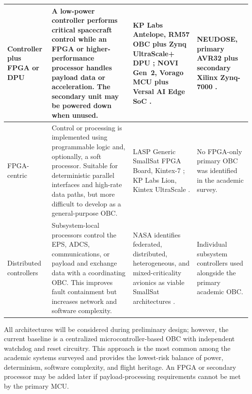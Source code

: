 \documentclass[10pt]{../datasheet}
\let\cite\citep
\begin{document}
\begin{longtable}{|p{2.8cm}|p{4.6cm}|p{5.3cm}|p{3.8cm}|}
  Controller plus FPGA or DPU                               &
  A low-power controller performs critical spacecraft control while an FPGA or
  higher-performance processor handles payload data or acceleration. The
  secondary unit may be powered down when unused.           &
  KP Labs Antelope, RM57 OBC plus Zynq UltraScale+ DPU
  \cite[p.~230]{nasa_soa_2023};
  NOVI Gen~2, Vorago MCU plus Versal AI Edge SoC
  \cite[p.~232]{nasa_soa_2026}.                             &
  NEUDOSE, primary AVR32 plus secondary Xilinx Zynq-7000
  \cite{neudose_obc_pub}.                                                              \\ \hline

  FPGA-centric                                              &
  Control or processing is implemented using programmable logic and,
  optionally, a soft processor. Suitable for deterministic parallel interfaces
  and high-rate data paths, but more difficult to develop as a general-purpose
  OBC.                                                      &
  LASP Generic SmallSat FPGA Board, Kintex-7
  \cite[p.~230]{nasa_soa_2023};
  KP Labs Lion, Kintex UltraScale
  \cite[p.~230]{nasa_soa_2023}.                             &
  No FPGA-only primary OBC was identified in the academic survey.                      \\ \hline

  Distributed controllers                                   &
  Subsystem-local processors control the EPS, ADCS, communications, or payload
  and exchange data with a coordinating OBC. This improves fault containment but
  increases network and software complexity.                &
  NASA identifies federated, distributed, heterogeneous, and mixed-criticality
  avionics as viable SmallSat architectures
  \cite[p.~225]{nasa_soa_2023}
  \cite[p.~221--222]{nasa_soa_2026}.                        &
  Individual subsystem controllers used alongside the primary academic OBC.            \\ \hline
\end{longtable}

All architectures will be considered during preliminary design; however, the
current baseline is a centralized microcontroller-based OBC with independent
watchdog and reset circuitry. This approach is the most common among the
academic systems surveyed and provides the lowest-risk balance of power,
determinism, software complexity, and flight heritage. An FPGA or secondary
processor may be added later if payload-processing requirements cannot be met
by the primary MCU.
\end{document}
